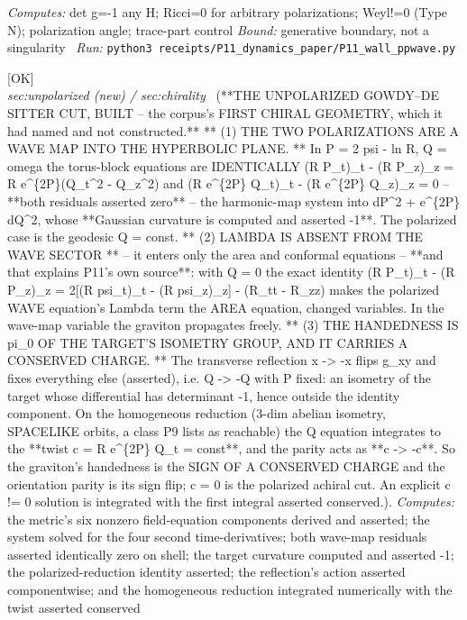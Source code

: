 \begin{description}
\emph{Computes:} det g=-1 any H; Ricci=0 for arbitrary polarizations; Weyl!=0 (Type N); polarization angle; trace-part control
 \emph{Bound:} generative boundary, not a singularity
\ \emph{Run:} \texttt{python3 receipts/P11\_dynamics\_paper/P11\_wall\_ppwave.py}
\item[\rcptlabel{P11_unpolarized_gowdy_cut}{P11R7}\textbf{P11R7}\quad\texttt{P11\_unpolarized\_gowdy\_cut}]\hfill\textsf{[OK]}\\
\textit{sec:unpolarized (new) / sec:chirality} \ (**THE UNPOLARIZED GOWDY--DE SITTER CUT, BUILT -- the corpus's FIRST CHIRAL GEOMETRY, which it had named and not constructed.** ** (1) THE TWO POLARIZATIONS ARE A WAVE MAP INTO THE HYPERBOLIC PLANE. ** In P = 2 psi - ln R, Q = omega the torus-block equations are IDENTICALLY (R P\_t)\_t - (R P\_z)\_z = R e\textasciicircum{}\{2P\}(Q\_t\textasciicircum{}2 - Q\_z\textasciicircum{}2) and (R e\textasciicircum{}\{2P\} Q\_t)\_t - (R e\textasciicircum{}\{2P\} Q\_z)\_z = 0 -- **both residuals asserted zero** -- the harmonic-map system into dP\textasciicircum{}2 + e\textasciicircum{}\{2P\} dQ\textasciicircum{}2, whose **Gaussian curvature is computed and asserted -1**. The polarized case is the geodesic Q = const. ** (2) LAMBDA IS ABSENT FROM THE WAVE SECTOR ** -- it enters only the area and conformal equations -- **and that explains P11's own source**: with Q = 0 the exact identity (R P\_t)\_t - (R P\_z)\_z = 2[(R psi\_t)\_t - (R psi\_z)\_z] - (R\_tt - R\_zz) makes the polarized WAVE equation's Lambda term the AREA equation, changed variables. In the wave-map variable the graviton propagates freely. ** (3) THE HANDEDNESS IS pi\_0 OF THE TARGET'S ISOMETRY GROUP, AND IT CARRIES A CONSERVED CHARGE. ** The transverse reflection x -> -x flips g\_xy and fixes everything else (asserted), i.e. Q -> -Q with P fixed: an isometry of the target whose differential has determinant -1, hence outside the identity component. On the homogeneous reduction (3-dim abelian isometry, SPACELIKE orbits, a class P9 lists as reachable) the Q equation integrates to the **twist c = R e\textasciicircum{}\{2P\} Q\_t = const**, and the parity acts as **c -> -c**. So the graviton's handedness is the SIGN OF A CONSERVED CHARGE and the orientation parity is its sign flip; c = 0 is the polarized achiral cut. An explicit c != 0 solution is integrated with the first integral asserted conserved.). 
\emph{Computes:} the metric's six nonzero field-equation components derived and asserted; the system solved for the four second time-derivatives; both wave-map residuals asserted identically zero on shell; the target curvature computed and asserted -1; the polarized-reduction identity asserted; the reflection's action asserted componentwise; and the homogeneous reduction integrated numerically with the twist asserted conserved

\end{description}
